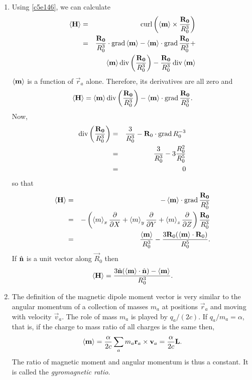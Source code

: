 \begin{enumerate}
\item Using \eqref{c5e146}, we can calculate
\begin{eqnarray*}
\left\langle{\mathbf{H}}\right\rangle &=& \operatorname{curl}\left(\left\langle{\mathbf{m}}\right\rangle \times \frac{\mathbf{R_0}}{R_0^3}\right) \\
 &=& \frac{\mathbf{R_0}}{R_0^3}\cdot\operatorname{grad}\left\langle{\mathbf{m}}\right\rangle - \left\langle{\mathbf{m}}\right\rangle\cdot\operatorname{grad}\frac{\mathbf{R_0}}{R_0^3} + \\
 & & \left\langle{\mathbf{m}}\right\rangle\operatorname{div}\left(\frac{\mathbf{R_0}}{R_0^3}\right) - \frac{\mathbf{R_0}}{R_0^3}\operatorname{div}\left\langle{\mathbf{m}}\right\rangle
\end{eqnarray*}
$\left\langle{\mathbf{m}}\right\rangle$ is a function of $\vec{r}_a$ alone. Therefore, its derivatives are all
zero and
\begin{equation}\label{c5e147}
\left\langle{\mathbf{H}}\right\rangle = \left\langle{\mathbf{m}}\right\rangle\operatorname{div}\left(\frac{\mathbf{R_0}}{R_0^3}\right) -
\left\langle{\mathbf{m}}\right\rangle\cdot\operatorname{grad}\frac{\mathbf{R_0}}{R_0^3}.
\end{equation}
Now,
\begin{eqnarray*}
\operatorname{div}\left(\frac{\mathbf{R_0}}{R_0^3}\right) &=& \frac{3}{R_0^3} - \mathbf{R}_0\cdot\operatorname{grad} R_0^{-3} \\
 &=& \frac{3}{R_0^3} - 3\frac{R_0^2}{R_0^5} \\
 &=& 0
\end{eqnarray*}
so that
\begin{eqnarray*}
\left\langle{\mathbf{H}}\right\rangle &=& -\left\langle{\mathbf{m}}\right\rangle\cdot\operatorname{grad}\frac{\mathbf{R_0}}{R_0^3} \\
 &=& -\left(\left\langle{m}\right\rangle_x\frac{\partial}{\partial X} + \left\langle{m}\right\rangle_y\frac{\partial}{\partial Y} + 
     \left\langle{m}\right\rangle_z\frac{\partial}{\partial Z}\right)\frac{\mathbf{R_0}}{R_0^3} \\
 &=& \frac{\left\langle{\mathbf{m}}\right\rangle}{R_0^3} - \frac{3\mathbf{R}_0(\left\langle{\mathbf{m}}\right\rangle\cdot\mathbf{R}_0)}{R_0^5}.
\end{eqnarray*}
If $\hat{\mathbf{n}}$ is a unit vector along $\vec{R}_0$ then
\begin{equation}\label{c5e148}
\left\langle{\mathbf{H}}\right\rangle = \frac{3\hat{\mathbf{n}}(\left\langle{\mathbf{m}}\right\rangle\cdot\hat{\mathbf{n}}) - \left\langle{\mathbf{m}}\right\rangle}{R_0^3}.
\end{equation}

\item The definition of the magnetic dipole moment vector is very similar to the
angular momentum of a collection of masses $m_a$ at positions $\vec{r}_a$ and 
moving with velocity $\vec{v}_a$. The role of mass $m_a$ is played by $q_a/(2c)$.
If $q_a/m_a = \alpha$, that is, if the charge to mass ratio of all charges is the
same then,
\begin{equation}\label{c5e149}
\left\langle{\mathbf{m}}\right\rangle = \frac{\alpha}{2c}\sum_a m_a\mathbf{r}_a \times \mathbf{v}_a = 
\frac{\alpha}{2c}\mathbf{L}.
\end{equation}
The ratio of magnetic moment and angular momentum is thus a constant. It is called
the \emph{gyromagnetic ratio}.


\end{enumerate}
